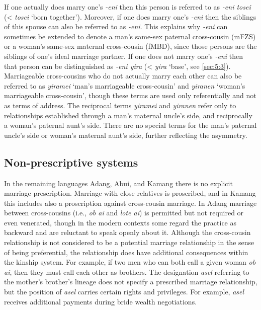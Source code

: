 If one actually does marry one's \textit{-eni} then this person is referred to as \textit{-eni tosei} ({\textless} \textit{tosei} `born together'). Moreover, if one does marry one's \textit{-eni} then the siblings of this spouse can also be referred to as \textit{-eni}. This explains why \textit{-eni} can sometimes be extended to denote a man's same-sex paternal cross-cousin (mFZS) or a woman's same-sex maternal cross-cousin (fMBD), since those persons are the siblings of one's ideal marriage partner. If one does not marry one's \textit{-eni} then that person can be distinguished as \textit{-eni yira} ({\textless} \textit{yira} `base', see {\SS} \ref{sec:5:3}). Marriageable cross-cousins who do not actually marry each other can also be referred to as \textit{yiramei} `man's marriageable cross-cousin' and \textit{yiranen} `woman's marriageable cross-cousin', though these terms are used only referentially and not as terms of address. The reciprocal terms \textit{yiramei} and \textit{yiranen} refer only to relationships established through a man's maternal uncle's side, and reciprocally a woman's paternal aunt's side. There are no special terms for the man's paternal uncle's side or woman's maternal aunt's side, further reflecting the asymmetry. 

\subsection{Non-prescriptive systems}
In the remaining languages Adang, Abui, and Kamang there is no explicit marriage prescription. Marriage with close relatives is proscribed, and in Kamang this includes also a proscription against cross-cousin marriage. In Adang marriage between cross-cousins (i.e., \textit{ob ai} and \textit{lote ai}) is permitted but not required or even venerated, though in the modern contexts some regard the practice as backward and are reluctant to speak openly about it. Although the cross-cousin relationship is not considered to be a potential marriage relationship in the sense of being preferential, the relationship does have additional consequences within the kinship system. For example, if two men who can both call a given woman \textit{ob ai}, then they must call each other as brothers. The designation \textit{asel} referring to the mother's brother's lineage does not specify a prescribed marriage relationship, but the position of \textit{asel} carries certain rights and privileges. For example, \textit{asel} receives additional payments during bride wealth negotiations. 

